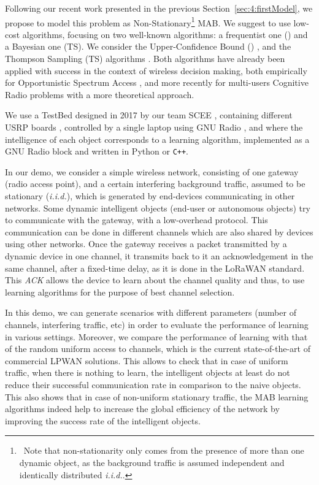 Following our recent work presented in the previous Section~\ref{sec:4:firstModel}, we propose to model this problem as Non-Stationary\footnote{~Note that non-stationarity only comes from the presence of more than one dynamic object, as the background traffic is assumed independent and identically distributed \emph{i.i.d.}.} MAB.
We suggest to use low-cost algorithms, focusing on two well-known algorithms: a frequentist one (\UCB{}) and a Bayesian one (TS).
We consider the Upper-Confidence Bound (\UCB{}) \cite{Auer02}, and the Thompson Sampling (TS) algorithms \cite{Thompson33}. Both algorithms have already been applied with success in the context of wireless decision making, both empirically for Opportunistic Spectrum Access \cite{Jouini10},
and more recently for multi-users Cognitive Radio problems \cite{Besson2018ALT} with a more theoretical approach.

We use a TestBed designed in 2017 by our team SCEE \cite{Bodinier17}, containing different USRP boards \cite{USRPDocumentation}, controlled by a single laptop using GNU Radio \cite{GNURadioDocumentation},
and where the intelligence of each object corresponds to a learning algorithm, implemented as a GNU Radio block \cite{GNURadioCompanionDocumentation} and written in Python or \texttt{C++}.

In our demo, we consider a simple wireless network, consisting of one gateway (radio access point), and a certain interfering background traffic, assumed to be stationary (\emph{i.i.d.}), which is generated by end-devices communicating in other networks.
Some dynamic intelligent objects (end-user or autonomous objects) try to communicate with the gateway, with a low-overhead protocol. This communication can be done in different channels which are also shared by devices using other networks.
Once the gateway receives a packet transmitted by a dynamic device in one channel, it transmits back to it an acknowledgement in the same channel, after a fixed-time delay, as it is done in the LoRaWAN standard.
This \emph{ACK} allows the device to learn about the channel quality and thus, to use learning algorithms for the purpose of best channel selection.

In this demo, we can generate scenarios with different parameters (number of channels, interfering traffic, etc) in order to evaluate the performance of learning in various settings.
Moreover, we compare the performance of learning with that of the random uniform access to channels, which is the current state-of-the-art of commercial LPWAN solutions.
%
This allows to check that in case of uniform traffic, when there is nothing to learn, the intelligent objects at least do not reduce their successful communication rate in comparison to the naive objects.
This also shows that in case of non-uniform stationary traffic, the MAB learning algorithms indeed help to increase the global efficiency of the network by improving the success rate of the intelligent objects.

